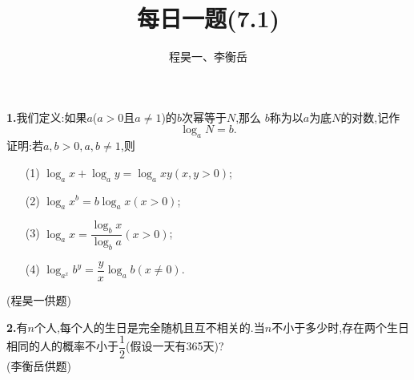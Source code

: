 \documentclass{article}
\title{每日一题(7.1)}
\author{程昊一、李衡岳}
\begin{document}
\maketitle
\textbf{1.}我们定义:如果$a$($a>0$且$a\neq 1$)的$b$次幂等于$N$,那么 $b$称为以$a$为底$N$的对数,记作
\[\log_aN=b.\]
证明:若$a,b>0,a,b\neq 1$,则
\begin{itemize}
	\item[(1)]$\log_ax+\log_ay=\log_axy$\quad$(x,y>0)$;
	\item[(2)]$\log_ax^b=b\log_ax$\quad$(x>0)$;
	\item[(3)]$\log_ax=\dfrac{\log_bx}{\log_ba}$\quad$(x>0)$;
	\item[(4)]$\log_{a^x}b^y=\dfrac{y}{x}\log_ab$\quad$(x\neq 0)$.
\end{itemize}
{(程昊一供题)}\\
\par\textbf{2.}有$n$个人,每个人的生日是完全随机且互不相关的.当$n$不小于多少时,存在两个生日相同的人的概率不小于$\dfrac{1}{2}$(假设一天有365天)?\\
{(李衡岳供题)}
\end{document}
